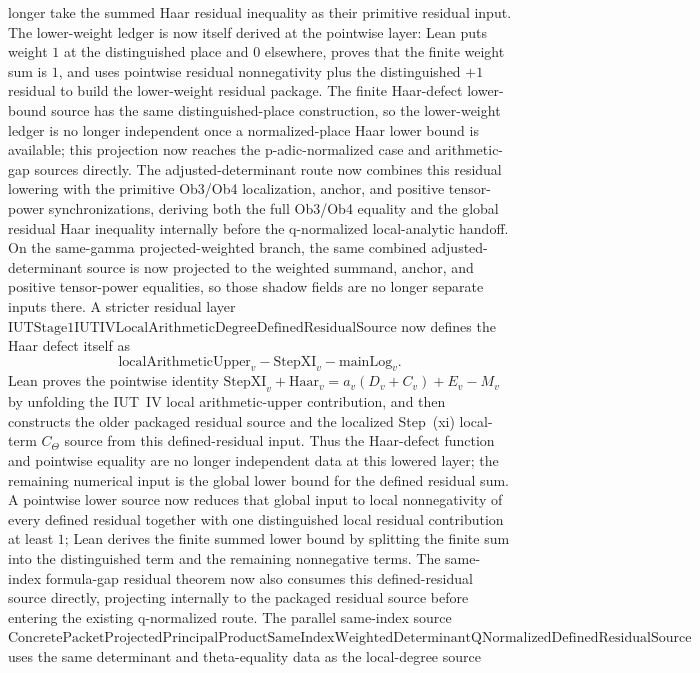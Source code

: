 \documentclass[11pt]{article}
\theoremstyle{plain}
\theoremstyle{definition}
\theoremstyle{remark}
\begin{document}
longer take the summed Haar residual inequality as their primitive residual
input.  The lower-weight ledger is now itself derived at the pointwise layer:
Lean puts weight \(1\) at the distinguished place and \(0\) elsewhere, proves
that the finite weight sum is \(1\), and uses pointwise residual
nonnegativity plus the distinguished \(+1\) residual to build the
lower-weight residual package.  The finite Haar-defect lower-bound source has
the same distinguished-place construction, so the lower-weight ledger is no
longer independent once a normalized-place Haar lower bound is available; this
projection now reaches the p-adic-normalized case and arithmetic-gap sources
directly.  The adjusted-determinant route now combines this residual lowering
with the primitive Ob3/Ob4 localization, anchor, and positive tensor-power
synchronizations, deriving both the full Ob3/Ob4 equality and the global
residual Haar inequality internally before the q-normalized local-analytic
handoff.  On the same-gamma projected-weighted branch, the same combined
adjusted-determinant source is now projected to the weighted summand, anchor,
and positive tensor-power equalities, so those shadow fields are no longer
separate inputs there.
A stricter residual layer
\(\mathrm{IUTStage1IUTIVLocalArithmeticDegreeDefinedResidualSource}\) now
defines the Haar defect itself as
\[
  \mathrm{localArithmeticUpper}_v-\mathrm{StepXI}_v-\mathrm{mainLog}_v .
\]
Lean proves the pointwise identity
\(\mathrm{StepXI}_v+\mathrm{Haar}_v=a_v(D_v+C_v)+E_v-M_v\) by unfolding the
IUT~IV local arithmetic-upper contribution, and then constructs the older
packaged residual source and the localized Step~(xi) local-term
\(C_\Theta\) source from this defined-residual input.  Thus the Haar-defect
function and pointwise equality are no longer independent data at this
lowered layer; the remaining numerical input is the global lower bound for
the defined residual sum.  A pointwise lower source now reduces that global
input to local nonnegativity of every defined residual together with one
distinguished local residual contribution at least \(1\); Lean derives the
finite summed lower bound by splitting the finite sum into the distinguished
term and the remaining nonnegative terms.  The same-index formula-gap residual theorem now
also consumes this defined-residual source directly, projecting internally to
the packaged residual source before entering the existing q-normalized route.
The parallel same-index source
\(\mathrm{ConcretePacketProjectedPrincipalProductSameIndexWeightedDeterminantQNormalizedDefinedResidualSource}\)
uses the same determinant and theta-equality data as the local-degree source
\end{document}
